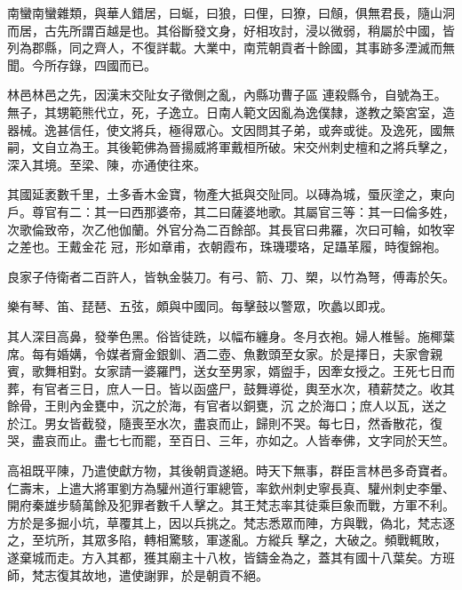 
\begin{pinyinscope}

 南蠻南蠻雜類，與華人錯居，曰蜒，曰狼，曰俚，曰獠，曰頠，俱無君長，隨山洞而居，古先所謂百越是也。其俗斷發文身，好相攻討，浸以微弱，稍屬於中國，皆列為郡縣，同之齊人，不復詳載。大業中，南荒朝貢者十餘國，其事跡多湮滅而無聞。今所存錄，四國而已。



 林邑林邑之先，因漢末交阯女子徵側之亂，內縣功曹子區
 連殺縣令，自號為王。無子，其甥範熊代立，死，子逸立。日南人範文因亂為逸僕隸，遂教之築宮室，造器械。逸甚信任，使文將兵，極得眾心。文因問其子弟，或奔或徙。及逸死，國無嗣，文自立為王。其後範佛為晉揚威將軍戴桓所破。宋交州刺史檀和之將兵擊之，深入其境。至梁、陳，亦通使往來。



 其國延袤數千里，土多香木金寶，物產大抵與交阯同。以磚為城，蜃灰塗之，東向戶。尊官有二：其一曰西那婆帝，其二曰薩婆地歌。其屬官三等：其一曰倫多姓，次歌倫致帝，次乙他伽蘭。外官分為二百餘部。其長官曰弗羅，次曰可輪，如牧宰之差也。王戴金花
 冠，形如章甫，衣朝霞布，珠璣瓔珞，足躡革履，時復錦袍。



 良家子侍衛者二百許人，皆執金裝刀。有弓、箭、刀、槊，以竹為弩，傅毒於矢。



 樂有琴、笛、琵琶、五弦，頗與中國同。每擊鼓以警眾，吹蠡以即戎。



 其人深目高鼻，發拳色黑。俗皆徒跣，以幅布纏身。冬月衣袍。婦人椎髻。施椰葉席。每有婚媾，令媒者齎金銀釧、酒二壺、魚數頭至女家。於是擇日，夫家會親賓，歌舞相對。女家請一婆羅門，送女至男家，婿盥手，因牽女授之。王死七日而葬，有官者三日，庶人一日。皆以函盛尸，鼓舞導從，輿至水次，積薪焚之。收其餘骨，王則內金甕中，沉之於海，有官者以銅甕，沉
 之於海口；庶人以瓦，送之於江。男女皆截發，隨喪至水次，盡哀而止，歸則不哭。每七日，然香散花，復哭，盡哀而止。盡七七而罷，至百日、三年，亦如之。人皆奉佛，文字同於天竺。



 高祖既平陳，乃遣使獻方物，其後朝貢遂絕。時天下無事，群臣言林邑多奇寶者。仁壽末，上遣大將軍劉方為驩州道行軍總管，率欽州刺史寧長真、驩州刺史李暈、開府秦雄步騎萬餘及犯罪者數千人擊之。其王梵志率其徒乘巨象而戰，方軍不利。方於是多掘小坑，草覆其上，因以兵挑之。梵志悉眾而陣，方與戰，偽北，梵志逐之，至坑所，其眾多陷，轉相驚駭，軍遂亂。方縱兵
 擊之，大破之。頻戰輒敗，遂棄城而走。方入其都，獲其廟主十八枚，皆鑄金為之，蓋其有國十八葉矣。方班師，梵志復其故地，遣使謝罪，於是朝貢不絕。




\end{pinyinscope}
